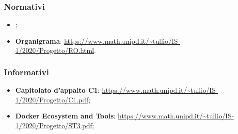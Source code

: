 \subsubsection{Normativi}
\begin{itemize}
    \item \NdPv{};
    \item \textbf{Organigrama}: \url{https://www.math.unipd.it/~tullio/IS-1/2020/Progetto/RO.html}.
\end{itemize}

\subsubsection{Informativi}
\begin{itemize}
    \item \textbf{Capitolato d'appalto C1}: \url{https://www.math.unipd.it/~tullio/IS-1/2020/Progetto/C1.pdf};
    \item \textbf{Docker Ecosystem and Tools}: \url{https://www.math.unipd.it/~tullio/IS-1/2020/Progetto/ST3.pdf};
\end{itemize}
